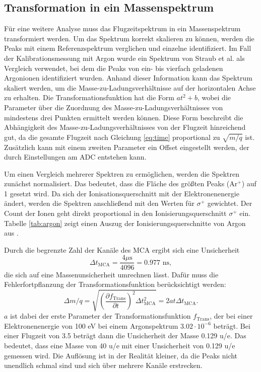 \subsection{Transformation in ein Massenspektrum}
Für eine weitere Analyse muss das Flugzeitspektrum in ein Massenspektrum transformiert werden. Um das Spektrum korrekt skalieren zu können, werden die Peaks mit einem Referenzspektrum verglichen und einzelne identifiziert. Im Fall der Kalibrationsmessung mit Argon wurde ein Spektrum von Straub et al. \cite{Straub} als Vergleich verwendet, bei dem die Peaks von ein- bis vierfach geladenen Argonionen identifiziert wurden. Anhand dieser Information kann das Spektrum skaliert werden, um die Masse-zu-Ladungsverhältnisse auf der horizontalen Achse zu erhalten. Die Transformationsfunktion hat die Form $at^2+b$, wobei die Parameter über die Zuordnung des Masse-zu-Ladungsverhältnisses von mindestens drei Punkten ermittelt werden können. Diese Form beschreibt die Abhängigkeit des Masse-zu-Ladungsverhältnisses von der Flugzeit hinreichend gut, da die gesamte Flugzeit nach Gleichung \ref{eq:time} proportional zu $\sqrt{m/q}$ ist. Zusätzlich kann mit einem zweiten Parameter ein Offset eingestellt werden, der durch Einstellungen am ADC entstehen kann. 

Um einen Vergleich mehrerer Spektren zu ermöglichen, werden die Spektren zunächst normalisiert. Das bedeutet, dass die Fläche des größten Peaks (Ar$^+$) auf 1 gesetzt wird. Da sich der Ionisationsquerschnitt mit der Elektronenenergie ändert, werden die Spektren anschließend mit den Werten für $\sigma^+$ gewichtet. Der Count der Ionen geht direkt proportional in den Ionisierungsquerschnitt $\sigma^+$ ein. Tabelle \ref{tab:argon} zeigt einen Auszug der Ionisierungsquerschnitte von Argon aus \cite{Straub}.

Durch die begrenzte Zahl der Kanäle des MCA ergibt sich eine Unsicherheit 
\begin{equation}
    \Delta t_{\mathrm{MCA}} = \frac{4 \text{$\mu$s}}{4096} = 0.977 \text{ ns},
\end{equation} 
die sich auf eine Massenunsicherheit umrechnen lässt. Dafür muss die Fehlerfortpflanzung der Transformationsfunktion berücksichtigt werden:
\begin{equation}
    \Delta m/q = \sqrt{\left(\frac{\partial f_\mathrm{Trans}}{\partial t}\right)^2 \Delta t_{\mathrm{MCA}}^2} = 2at\Delta t_{\mathrm{MCA}}.
\end{equation}
$a$ ist dabei der erste Parameter der Transformationsfunktion $f_\mathrm{Trans}$, der bei einer Elektronenenergie von 100 eV bei einem Argonspektrum $3.02 \cdot 10^{-6}$ beträgt. Bei einer Flugzeit von 3.5  beträgt dann die Unsicherheit der Masse 0.129 u/e. Das bedeutet, dass eine Masse von 40 u/e mit einer Unsicherheit von 0.129 u/e gemessen wird. Die Auflösung ist in der Realität kleiner, da die Peaks nicht unendlich schmal sind und sich über mehrere Kanäle erstrecken.

